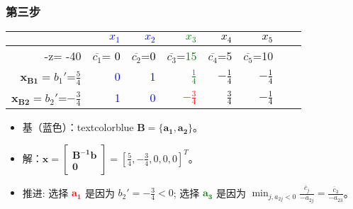 	\subsubsection{第三步}
		\begin{table}[h]
		\centering
\begin{tabular}{r|rrrrrrr}\hline
  & \textcolor{blue}{$x_1$} & \textcolor{blue}{$x_2$} & \textcolor{green}{$x_3$} & \textcolor{black}{$x_4$} & \textcolor{black}{$x_5$} \\
\hline
 -z= -40 & $\overline{c_1}$= \textcolor{black}{0}  & $\overline{c_2}$=\textcolor{black}{0} & $\overline{c_3}$=\textcolor{green}{15} & $\overline{c_4}$=5 & $\overline{c_5}$=10  \\
 \hline
 $\mathbf{x_{B1}} = b_1'$=$\frac{5}{4}$& \textcolor{blue}{0} & \textcolor{blue}{1}   & \textcolor{green}{$\frac{1}{4}$} & \textcolor{black}{$-\frac{1}{4}$} & \textcolor{black}{$-\frac{1}{4}$}  \\
 $\mathbf{x_{B2}} = b_2'$=$-\frac{3}{4}$ & \textcolor{blue}{1} & \textcolor{blue}{0} & \textcolor{red}{$-\frac{3}{4}$}  & \textcolor{black}{$\frac{3}{4}$} & \textcolor{black}{$-\frac{1}{4}$}  \\
\hline
\end{tabular}
\end{table}
		\begin{itemize}
		\item 基（蓝色）：textcolor{blue}{ $\mathbf{B =\{a_1, a_2 \} }$}。
		\item 解：$\mathbf{x=\left[\begin{array}{c}\mathbf{B^{-1}b}\\\mathbf{0}\end{array}\right]}= [ \frac{5}{4}, -\frac{3}{4}, 0, 0, 0 ]^T$。
		\item  推进: 选择 \textcolor{red}{$\mathbf{a_1}$} 是因为 $b_2' = -\frac{3}{4}  < 0$; 选择 \textcolor{green}{$\mathbf{a_3}$}  是因为 $\min_{j, a_{2j}<0} \frac{\overline{c}_j }{-a_{2j} } = \frac{ \overline{c}_3 }{-a_{23} }$。
	\end{itemize}

